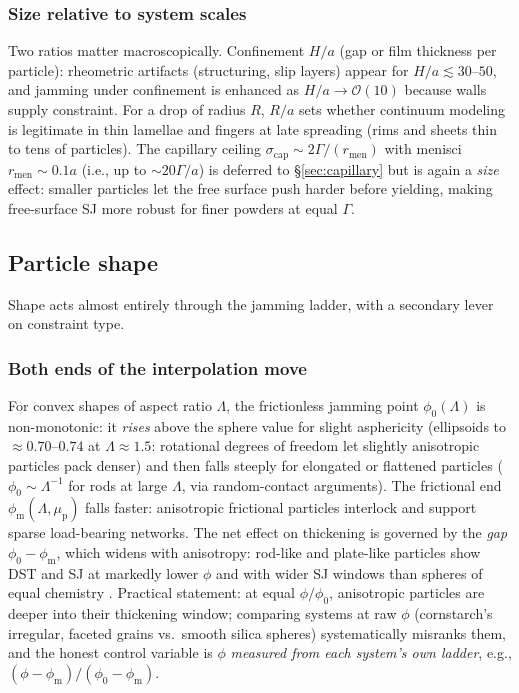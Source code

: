 \documentclass[11pt]{article}
\newcommand{\phiO}{\phi_{0}}
\newcommand{\phiM}{\phi_{\mathrm{m}}}
\newcommand{\mup}{\mu_{\mathrm{p}}}
\begin{document}
\subsubsection{Size relative to system scales}
Two ratios matter macroscopically. Confinement $H/a$ (gap or film thickness per particle): rheometric artifacts (structuring, slip layers) appear for $H/a \lesssim 30$--$50$, and jamming under confinement is enhanced as $H/a \to \mathcal{O}(10)$ because walls supply constraint. For a drop of radius $R$, $R/a$ sets whether continuum modeling is legitimate in thin lamellae and fingers at late spreading (rims and sheets thin to tens of particles). The capillary ceiling $\sigma_{\mathrm{cap}} \sim 2\Gamma/(r_{\mathrm{men}})$ with menisci $r_{\mathrm{men}} \sim 0.1 a$ (i.e., up to $\sim 20\Gamma/a$) is deferred to \S\ref{sec:capillary} but is again a \emph{size} effect: smaller particles let the free surface push harder before yielding, making free-surface SJ more robust for finer powders at equal $\Gamma$.

\subsection{Particle shape}
\label{sec:shape}

Shape acts almost entirely through the jamming ladder, with a secondary lever on constraint type.

\subsubsection{Both ends of the interpolation move}
For convex shapes of aspect ratio $\Lambda$, the frictionless jamming point $\phiO(\Lambda)$ is non-monotonic: it \emph{rises} above the sphere value for slight asphericity (ellipsoids to $\approx 0.70$--$0.74$ at $\Lambda \approx 1.5$: rotational degrees of freedom let slightly anisotropic particles pack denser) and then falls steeply for elongated or flattened particles ($\phiO \sim \Lambda^{-1}$ for rods at large $\Lambda$, via random-contact arguments). The frictional end $\phiM(\Lambda,\mup)$ falls faster: anisotropic frictional particles interlock and support sparse load-bearing networks. The net effect on thickening is governed by the \emph{gap} $\phiO - \phiM$, which widens with anisotropy: rod-like and plate-like particles show DST and SJ at markedly lower $\phi$ and with wider SJ windows than spheres of equal chemistry \cite{brown2011shape,egres2005,james2019fiber}. Practical statement: at equal $\phi/\phiO$, anisotropic particles are deeper into their thickening window; comparing systems at raw $\phi$ (cornstarch's irregular, faceted grains vs.\ smooth silica spheres) systematically misranks them, and the honest control variable is $\phi$ \emph{measured from each system's own ladder}, e.g., $(\phi-\phiM)/(\phiO-\phiM)$.
\end{document}
